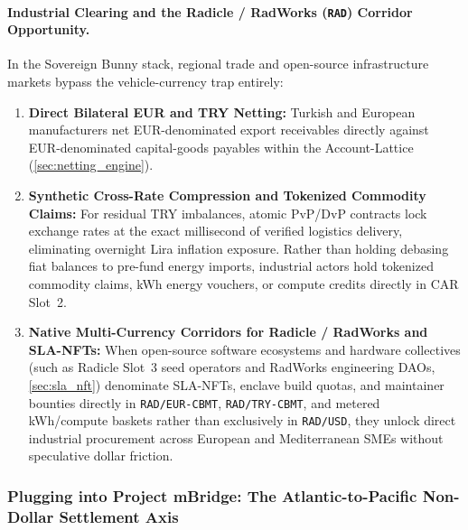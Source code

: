 \documentclass[a4paper,11pt,twoside,parskip=half-,headings=small]{scrartcl}
\newcommand{\code}[1]{\texttt{#1}}
\begin{document}
\paragraph{Industrial Clearing and the Radicle / RadWorks (\code{RAD}) Corridor Opportunity.}
In the Sovereign Bunny stack, regional trade and open-source infrastructure markets bypass the vehicle-currency trap entirely:
\begin{enumerate}[nosep]
  \item \textbf{Direct Bilateral EUR and TRY Netting:} Turkish and European manufacturers net EUR-denominated export receivables directly against EUR-denominated capital-goods payables within the Account-Lattice (\cref{sec:netting_engine}).
  \item \textbf{Synthetic Cross-Rate Compression and Tokenized Commodity Claims:} For residual TRY imbalances, atomic PvP/DvP contracts lock exchange rates at the exact millisecond of verified logistics delivery, eliminating overnight Lira inflation exposure. Rather than holding debasing fiat balances to pre-fund energy imports, industrial actors hold tokenized commodity claims, kWh energy vouchers, or compute credits directly in CAR Slot~2.
  \item \textbf{Native Multi-Currency Corridors for Radicle / RadWorks and SLA-NFTs:} When open-source software ecosystems and hardware collectives (such as Radicle Slot~3 seed operators and RadWorks engineering DAOs, \cref{sec:sla_nft}) denominate SLA-NFTs, enclave build quotas, and maintainer bounties directly in \code{RAD/EUR-CBMT}, \code{RAD/TRY-CBMT}, and metered kWh/compute baskets rather than exclusively in \code{RAD/USD}, they unlock direct industrial procurement across European and Mediterranean SMEs without speculative dollar friction.
\end{enumerate}

\subsubsection{Plugging into Project mBridge: The Atlantic-to-Pacific Non-Dollar Settlement Axis}
\end{document}
